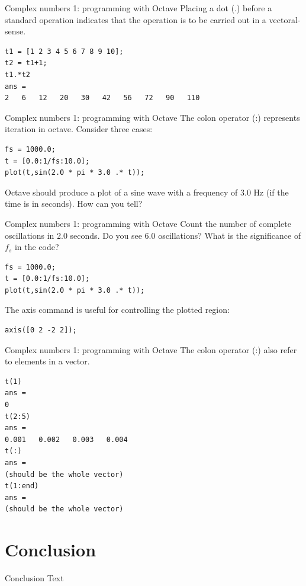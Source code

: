 \documentclass{beamer}
\begin{document}
\begin{frame}[fragile]{Complex numbers 1: programming with Octave}
Placing a dot (.) before a standard operation indicates that the operation is to be carried out in a vectoral-sense.
\begin{verbatim}
t1 = [1 2 3 4 5 6 7 8 9 10];
t2 = t1+1;
t1.*t2
ans =
2   6   12   20   30   42   56   72   90   110
\end{verbatim}
\end{frame}

\begin{frame}[fragile]{Complex numbers 1: programming with Octave}
The colon operator (:) represents iteration in octave.  Consider three cases:  \\
\begin{verbatim}
fs = 1000.0;
t = [0.0:1/fs:10.0];
plot(t,sin(2.0 * pi * 3.0 .* t));
\end{verbatim}
Octave should produce a plot of a sine wave with a frequency of 3.0 Hz (if the time is in seconds).  How can you tell?
\end{frame}

\begin{frame}[fragile]{Complex numbers 1: programming with Octave}
Count the number of complete oscillations in 2.0 seconds.  Do you see 6.0 oscillations?  What is the significance of $f_s$ in the code?
\begin{verbatim}
fs = 1000.0;
t = [0.0:1/fs:10.0];
plot(t,sin(2.0 * pi * 3.0 .* t));
\end{verbatim}
The \alert{axis} command is useful for controlling the plotted region:
\begin{verbatim}
axis([0 2 -2 2]);
\end{verbatim}
\end{frame}

\begin{frame}[fragile]{Complex numbers 1: programming with Octave}
The colon operator (:) also refer to elements in a vector.
\begin{verbatim}
t(1)
ans =
0
t(2:5)
ans = 
0.001   0.002   0.003   0.004
t(:)
ans = 
(should be the whole vector)
t(1:end)
ans =
(should be the whole vector)
\end{verbatim}
\end{frame}

\section{Conclusion}

\begin{frame}{Conclusion}
Text
\end{frame}
\end{document}
